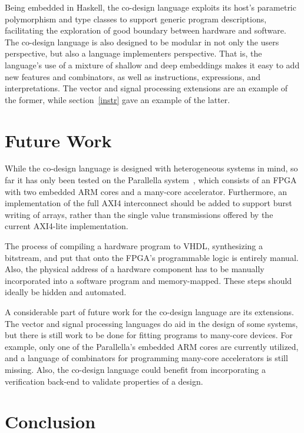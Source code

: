 \documentclass[../paper.tex]{subfiles}
\begin{document}
Being embedded in Haskell, the co-design language exploits its host's parametric polymorphism and type classes to support generic program descriptions, facilitating the exploration of good boundary between hardware and software. The co-design language is also designed to be modular in not only the users perspective, but also a language implementers perspective. That is, the language's use of a mixture of shallow and deep embeddings makes it easy to add new features and combinators, as well as instructions, expressions, and interpretations. The vector and signal processing extensions are an example of the former, while section~\ref{instr} gave an example of the latter.

\section{Future Work}
\label{future}

While the co-design language is designed with heterogeneous systems in mind, so far it has only been tested on the Parallella system~\cite{olofsson2014}, which consists of an FPGA with two embedded ARM cores and a many-core accelerator. Furthermore, an implementation of the full AXI4 interconnect should be added to support burst writing of arrays, rather than the single value transmissions offered by the current AXI4-lite implementation.

The process of compiling a hardware program to VHDL, synthesizing a bitstream, and put that onto the FPGA's programmable logic is entirely manual. Also, the physical address of a hardware component has to be manually incorporated into a software program and memory-mapped. These steps should ideally be hidden and automated.

A considerable part of future work for the co-design language are its extensions. The vector and signal processing languages do aid in the design of some systems, but there is still work to be done for fitting programs to many-core devices. For example, only one of the Parallella's embedded ARM cores are currently utilized, and a language of combinators for programming many-core accelerators is still missing. Also, the co-design language could benefit from incorporating a verification back-end to validate properties of a design.

\section{Conclusion}
\label{conc}
\end{document}
